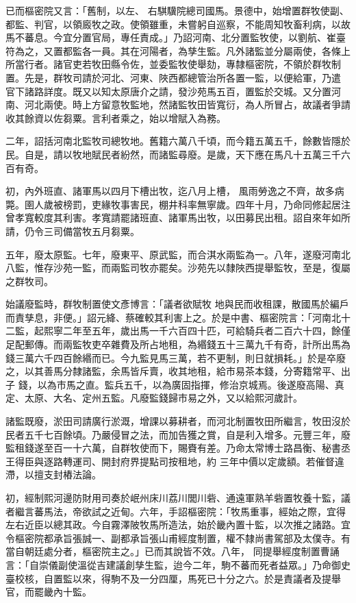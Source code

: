 \begin{pinyinscope}
 已而樞密院又言：「舊制，以左、
 右騏驥院總司國馬。景德中，始增置群牧使副、都監、判官，以領廄牧之政。使領雖重，未嘗躬自巡察，不能周知牧畜利病，以故馬不蕃息。今宜分置官局，專任責成。」乃詔河南、北分置監牧使，以劉航、崔臺符為之，又置都監各一員。其在河陽者，為孳生監。凡外諸監並分屬兩使，各條上所當行者。諸官吏若牧田縣令佐，並委監牧使舉劾，專隸樞密院，不領於群牧制置。先是，群牧司請於河北、河東、陜西都總管治所各置一監，以便給軍，乃遣
 官下諸路詳度。既又以知太原唐介之請，發沙苑馬五百，置監於交城。又分置河南、河北兩使。時上方留意牧監地，然諸監牧田皆寬衍，為人所冒占，故議者爭請收其餘資以佐芻粟。言利者乘之，始以增賦入為務。



 二年，詔括河南北監牧司總牧地。舊籍六萬八千頃，而今籍五萬五千，餘數皆隱於民。自是，請以牧地賦民者紛然，而諸監尋廢。是歲，天下應在馬凡十五萬三千六百有奇。



 初，內外班直、諸軍馬以四月下槽出牧，迄八月上槽，
 風雨勞逸之不齊，故多病斃。圉人歲被榜罰，吏緣牧事害民，棚井科率無寧歲。四年十月，乃命同修起居注曾孝寬較度其利害。孝寬請罷諸班直、諸軍馬出牧，以田募民出租。詔自來年如所請，仍令三司備當牧五月芻粟。



 五年，廢太原監。七年，廢東平、原武監，而合淇水兩監為一。八年，遂廢河南北八監，惟存沙苑一監，而兩監司牧亦罷矣。沙苑先以隸陜西提舉監牧，至是，復屬之群牧司。



 始議廢監時，群牧制置使文彥博言：「議者欲賦牧
 地與民而收租課，散國馬於編戶而責孳息，非便。」詔元絳、蔡確較其利害上之。於是中書、樞密院言：「河南北十二監，起熙寧二年至五年，歲出馬一千六百四十匹，可給騎兵者二百六十四，餘僅足配郵傳。而兩監牧吏卒雜費及所占地租，為緡錢五十三萬九千有奇，計所出馬為錢三萬六千四百餘緡而已。今九監見馬三萬，若不更制，則日就損耗。」於是卒廢之，以其善馬分隸諸監，余馬皆斥賣，收其地租，給市易茶本錢，分寄籍常平、出子
 錢，以為市馬之直。監兵五千，以為廣固指揮，修治京城焉。後遂廢高陽、真定、太原、大名、定州五監。凡廢監錢歸市易之外，又以給熙河歲計。



 諸監既廢，淤田司請廣行淤溉，增課以募耕者，而河北制置牧田所繼言，牧田沒於民者五千七百餘頃。乃嚴侵冒之法，而加告獲之賞，自是利入增多。元豐三年，廢監租錢遂至百一十六萬，自群牧使而下，賜賚有差。乃命太常博士路昌衡、秘書丞王得臣與逐路轉運司、開封府界提點司按租地，約
 三年中價以定歲額。若催督違滯，以擅支封樁法論。



 初，經制熙河邊防財用司奏於岷州床川荔川閭川砦、通遠軍熟羊砦置牧養十監，議者繼言蕃馬法，帝欲試之近甸。六年，手詔樞密院：「牧馬重事，經始之際，宜得左右近臣以總其政。今自霧澤陂牧馬所造法，始於畿內置十監，以次推之諸路。宜令樞密院都承旨張誠一、副都承旨張山甫經度制置，權不隸尚書駕部及太僕寺。有當自朝廷處分者，樞密院主之。」已而其說皆不效。八年，
 同提舉經度制置曹誦言：「自崇儀副使溫從吉建議創孳生監，迨今二年，駒不蕃而死者益眾。」乃命御史臺校核，自置監以來，得駒不及一分四厘，馬死已十分之六。於是責議者及提舉官，而罷畿內十監。




\end{pinyinscope}
